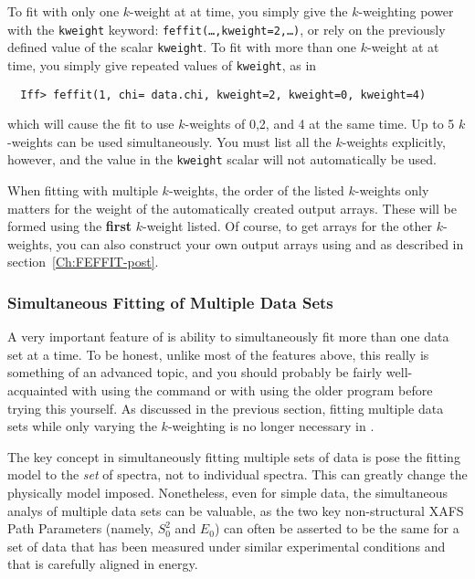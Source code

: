 To fit with only one $k$-weight at at time, you simply give the
$k$-weighting power with the {\tt{kweight}} keyword:
{\tt{feffit(\ldots,kweight=2,\ldots)}}, or rely on the previously defined
value of the scalar {\tt{kweight}}.  To fit with more than one $k$-weight
at at time, you  simply give repeated values of {\tt{kweight}}, as in
\begin{verbatim}
  Iff> feffit(1, chi= data.chi, kweight=2, kweight=0, kweight=4)
\end{verbatim}
\noindent
which will cause the fit to use $k$-weights of 0,2, and 4 at the same time.
Up to 5 $k$-weights can be used simultaneously.  You must list all the
$k$-weights explicitly, however, and the value in the {\tt{kweight}} scalar
will not automatically be used. 

When fitting with multiple $k$-weights, the order of the listed $k$-weights
only matters for the weight of the automatically created output {\chir}
arrays.  These will be formed using the {\bf{first}} $k$-weight listed.  Of
course, to get arrays for the other $k$-weights, you can also construct
your own output arrays using {} and {} as described
in section~{\ref{Ch:FEFFIT-post}}.


\subsubsection{Simultaneous Fitting of Multiple Data Sets} \label{Ch:FEFFIT-multi}
{}

A very important feature of {\ifeffit} is ability to simultaneously fit
more than one data set at a time.  To be honest, unlike most of the
features above, this really is something of an advanced topic, and you
should probably be fairly well-acquainted with using the {}
command or with using the older {\feffit} program before trying this
yourself.  As discussed in the previous section, fitting multiple data sets
while only varying the $k$-weighting is no longer necessary in {\ifeffit}. 

The key concept in simultaneously fitting multiple sets of data is pose the
fitting model to the {\emph{set}} of spectra, not to individual spectra.
This can greatly change the physically model imposed.  Nonetheless, even
for simple data, the simultaneous analys of multiple data sets can be
valuable, as the two key non-structural XAFS Path Parameters (namely,
$S_0^2$ and $E_0$) can often be asserted to be the same for a set of data
that has been measured under similar experimental conditions and that is
carefully aligned in energy. 


